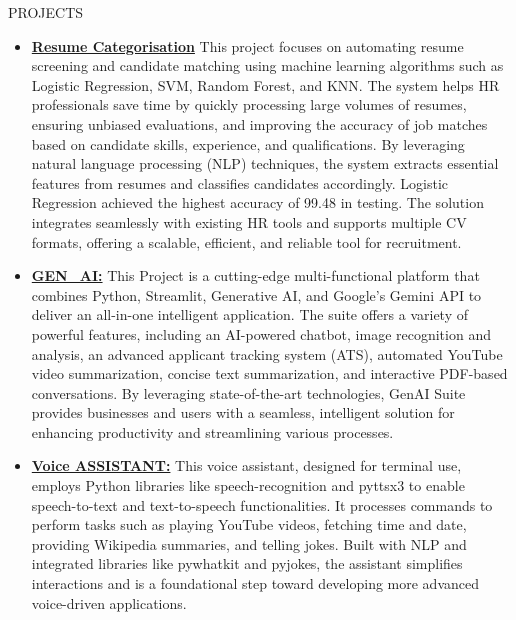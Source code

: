 \documentclass{resume}
\begin{document}
\begin{rSection}{PROJECTS}
    \begin{itemize}
        \item \textbf{\href{https://github.com/trishaamandal/tracking_number}{Resume Categorisation}} {This project focuses on automating resume screening and candidate matching using machine learning algorithms such as Logistic Regression, SVM, Random Forest, and KNN. The system helps HR professionals save time by quickly processing large volumes of resumes, ensuring unbiased evaluations, and improving the accuracy of job matches based on candidate skills, experience, and qualifications. By leveraging natural language processing (NLP) techniques, the system extracts essential features from resumes and classifies candidates accordingly. Logistic Regression achieved the highest accuracy of 99.48 in testing. The solution integrates seamlessly with existing HR tools and supports multiple CV formats, offering a scalable, efficient, and reliable tool for recruitment. }
        \vspace{-0.6em}
        \item \textbf{\href{https://github.com/trishaamandal/Gen-AI}{GEN\_AI:}} {This Project is a cutting-edge multi-functional platform that combines Python, Streamlit, Generative AI, and Google's Gemini API to deliver an all-in-one intelligent application. The suite offers a variety of powerful features, including an AI-powered chatbot, image recognition and analysis, an advanced applicant tracking system (ATS), automated YouTube video summarization, concise text summarization, and interactive PDF-based conversations. By leveraging state-of-the-art technologies, GenAI Suite provides businesses and users with a seamless, intelligent solution for enhancing productivity and streamlining various processes.
        }
        \vspace{-0.6em}
        \item \textbf{\href{https://github.com/trishaamandal/VoiceAssistent}{Voice ASSISTANT:}} {This voice assistant, designed for terminal use, employs Python libraries like speech-recognition and pyttsx3 to enable speech-to-text and text-to-speech functionalities. It processes commands to perform tasks such as playing YouTube videos, fetching time and date, providing Wikipedia summaries, and telling jokes. Built with NLP and integrated libraries like pywhatkit and pyjokes, the assistant simplifies interactions and is a foundational step toward developing more advanced voice-driven applications.}
        \vspace{-0.6em}

\end{itemize}
\end{rSection}
\end{document}
